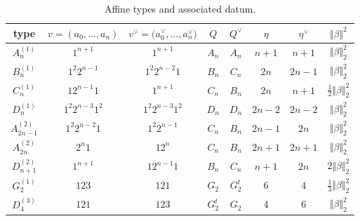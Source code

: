 \documentclass[pdftex]{sigma}
\numberwithin{equation}{section}
\begin{document}
\begin{table}[h]\centering \renewcommand{\arraystretch}{1.32}\caption{Affine types and associated datum.}
\begin{tabular}{|c|c|c|c|c|c|c|c|}
\hline
type & $v=(a_{0},\dots ,a_{n})$ & $v^{\vee }=\bigl(a_{0}^{\vee },\dots
,a_{n}^{\vee }\bigr)$ & $Q$ & $Q^{\vee }$ & $\eta $ & $\eta ^{\vee }$ & $%
 \Vert \beta  \Vert ^{2}$ \\ \hline
$A_{n}^{(1)}$ & $1^{n+1}$ & $1^{n+1}$ & $A_{n}$ & $A_{n}$ & $n+1$ & $n+1$ & $%
 \Vert \beta  \Vert _{2}^{2}$ \\ \hline
$B_{n}^{(1)}$ & $1^{2}2^{n-1}$ & $1^{2}2^{n-2}1$ & $B_{n}$ & $C_{n}$ & $2n$
& $2n-1$ & $ \Vert \beta  \Vert _{2}^{2}$ \\ \hline
$C_{n}^{(1)}$ & $12^{n-1}1$ & $1^{n+1}$ & $C_{n}$ & $B_{n}$ & $2n$ & $n+1$ &
$\frac{1}{2} \Vert \beta  \Vert _{2}^{2}$ \\ \hline
$D_{n}^{(1)}$ & $1^{2}2^{n-3}1^{2}$ & $1^{2}2^{n-3}1^{2}$ & $D_{n}$ & $D_{n}$
& $2n-2$ & $2n-2$ & $ \Vert \beta  \Vert _{2}^{2}$ \\ \hline
$A_{2n-1}^{(2)}$ & $1^{2}2^{n-2}1$ & $1^{2}2^{n-1}$ & $C_{n}$ & $B_{n}$ & $%
2n-1$ & $2n$ & $ \Vert \beta  \Vert _{2}^{2}$ \\ \hline
$A_{2n}^{(2)}$ & $2^{n}1$ & $12^{n}$ & $C_{n}$ & $B_{n}$ & $2n+1$ & $2n+1$ &
$ \Vert \beta  \Vert _{2}^{2}$ \\ \hline
$D_{n+1}^{(2)}$ & $1^{n+1}$ & $12^{n-1}1$ & $B_{n}$ & $C_{n}$ & $n+1$ & $2n$
& $2 \Vert \beta  \Vert _{2}^{2}$ \\ \hline
$G_{2}^{(1)}$ & $123$ & $121$ & $G_{2}$ & $G_{2}^{t}$ & $6$ & $4$ & $\frac{1%
}{3} \Vert \beta  \Vert _{2}^{2}$ \\ \hline
$D_{4}^{(3)}$ & $121$ & $123$ & $G_{2}^{t}$ & $G_{2}$ & $4$ & $6$ & $%
 \Vert \beta  \Vert _{2}^{2}$ \\ \hline
\end{tabular}
\end{table}
\end{document}
